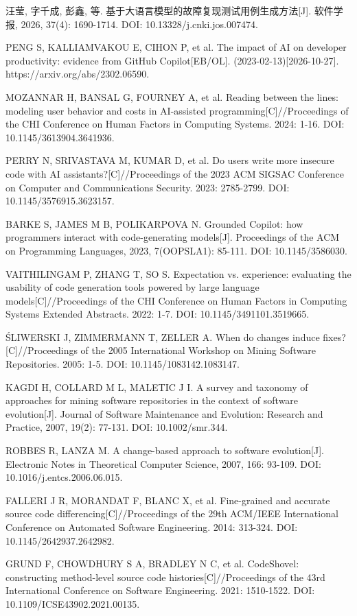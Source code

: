 {\begin{tjreflist}
\item 汪莹, 字千成, 彭鑫, 等. 基于大语言模型的故障复现测试用例生成方法[J]. 软件学报, 2026, 37(4): 1690-1714. DOI: 10.13328/j.cnki.jos.007474.
\item PENG S, KALLIAMVAKOU E, CIHON P, et al. The impact of AI on developer productivity: evidence from GitHub Copilot[EB/OL]. (2023-02-13)[2026-10-27]. https://arxiv.org/abs/2302.06590.
\item MOZANNAR H, BANSAL G, FOURNEY A, et al. Reading between the lines: modeling user behavior and costs in AI-assisted programming[C]//Proceedings of the CHI Conference on Human Factors in Computing Systems. 2024: 1-16. DOI: 10.1145/3613904.3641936.
\item PERRY N, SRIVASTAVA M, KUMAR D, et al. Do users write more insecure code with AI assistants?[C]//Proceedings of the 2023 ACM SIGSAC Conference on Computer and Communications Security. 2023: 2785-2799. DOI: 10.1145/3576915.3623157.
\item BARKE S, JAMES M B, POLIKARPOVA N. Grounded Copilot: how programmers interact with code-generating models[J]. Proceedings of the ACM on Programming Languages, 2023, 7(OOPSLA1): 85-111. DOI: 10.1145/3586030.
\item VAITHILINGAM P, ZHANG T, SO S. Expectation vs. experience: evaluating the usability of code generation tools powered by large language models[C]//Proceedings of the CHI Conference on Human Factors in Computing Systems Extended Abstracts. 2022: 1-7. DOI: 10.1145/3491101.3519665.
\item ŚLIWERSKI J, ZIMMERMANN T, ZELLER A. When do changes induce fixes?[C]//Proceedings of the 2005 International Workshop on Mining Software Repositories. 2005: 1-5. DOI: 10.1145/1083142.1083147.
\item KAGDI H, COLLARD M L, MALETIC J I. A survey and taxonomy of approaches for mining software repositories in the context of software evolution[J]. Journal of Software Maintenance and Evolution: Research and Practice, 2007, 19(2): 77-131. DOI: 10.1002/smr.344.
\item ROBBES R, LANZA M. A change-based approach to software evolution[J]. Electronic Notes in Theoretical Computer Science, 2007, 166: 93-109. DOI: 10.1016/j.entcs.2006.06.015.
\item FALLERI J R, MORANDAT F, BLANC X, et al. Fine-grained and accurate source code differencing[C]//Proceedings of the 29th ACM/IEEE International Conference on Automated Software Engineering. 2014: 313-324. DOI: 10.1145/2642937.2642982.
\item GRUND F, CHOWDHURY S A, BRADLEY N C, et al. CodeShovel: constructing method-level source code histories[C]//Proceedings of the 43rd International Conference on Software Engineering. 2021: 1510-1522. DOI: 10.1109/ICSE43902.2021.00135.

\end{tjreflist}}
